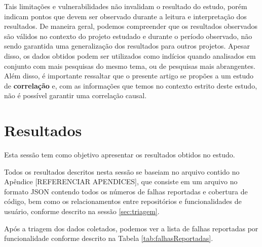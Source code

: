 \documentclass[11.5pt]{article}
\begin{document}
Tais limitações e vulnerabilidades não invalidam o resultado do estudo, porém indicam pontos que
devem ser observado durante a leitura e interpretação dos resultados.
De maneira geral, podemos compreender que os resultados observados são válidos no contexto do
projeto estudado e durante o período observado, não sendo garantida uma generalização dos resultados
para outros projetos.
Apesar disso, os dados obtidos podem ser utilizados como indícios quando analisados em conjunto com
mais pesquisas do mesmo tema, ou de pesquisas mais abrangentes.
Além disso, é importante ressaltar que o presente artigo se propões a um estudo de
\textbf{correlação} e, com as informações que temos no contexto estrito deste estudo, não é possível
garantir uma correlação causal.




\section{Resultados} \label{sec:resultados}

Esta sessão tem como objetivo apresentar os resultados obtidos no estudo.

Todos os resultados descritos nesta sessão se baseiam no arquivo contido no Apêndice
[REFERENCIAR APENDICES], que consiste em um arquivo no formato JSON contendo todos os números de
falhas reportadas e cobertura de código, bem como os relacionamentos entre repositórios e
funcionalidades de usuário, conforme descrito na sessão \ref{sec:triagem}.

Após a triagem dos dados coletados, podemos ver a lista de falhas reportadas por funcionalidade
conforme descrito na Tabela \ref{tab:falhasReportadas}.
\end{document}

